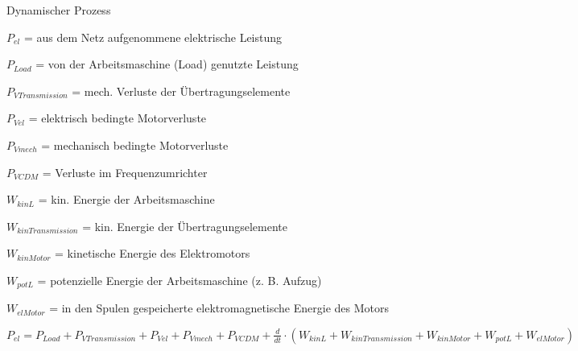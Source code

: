 \documentclass[german]{latex4ei/latex4ei_sheet}
\begin{document}
\begin{sectionbox}
			\begin{bluebox}{Dynamischer Prozess}
					\item $P_{el}$ = aus dem Netz aufgenommene elektrische Leistung
					\item $P_{Load} $ = von der Arbeitsmaschine (Load) genutzte Leistung
					\item $P_{VTransmission} $ = mech. Verluste der Übertragungselemente
					\item $P_{Vel} $ = elektrisch bedingte Motorverluste
					\item $P_{Vmech} $ = mechanisch bedingte Motorverluste
					\item $P_{VCDM} $ = Verluste im Frequenzumrichter
					\item $W_{kinL} $ = kin. Energie der Arbeitsmaschine
					\item $W_{kinTransmission} $ = kin. Energie der Übertragungselemente
					\item $W_{kinMotor} $ = kinetische Energie des Elektromotors
					\item $W_{potL} $ = potenzielle Energie der Arbeitsmaschine (z. B. Aufzug)
					\item $W_{elMotor} $ = in den Spulen gespeicherte elektromagnetische Energie des Motors
					\item $P_{el} = P_{Load} + P_{VTransmission} + P_{Vel} + P_{Vmech} + P_{VCDM} + \frac{d}{dt}\cdot (W_{kinL}+W_{kinTransmission} + W_{kinMotor} + W_{potL} + W_{elMotor})$
			\end{bluebox}
			

\end{sectionbox}
\end{document}
